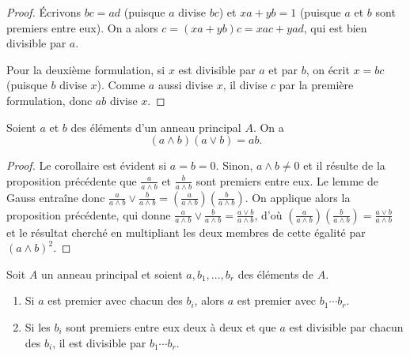 \documentclass[]{report}
\begin{document}
\begin{proof}
    Écrivons $bc = ad$ (puisque $a$ divise $bc$) et $xa + yb = 1$ (puisque $a$ et $b$ sont premiers entre eux). On a alors $c = (xa + yb)c = xac + yad$, qui est bien divisible par $a$.

    Pour la deuxième formulation, si $x$ est divisible par $a$ et par $b$, on écrit $x = bc$ (puisque $b$ divise $x$). Comme $a$ aussi divise $x$, il divise $c$ par la première formulation, donc $ab$ divise $x$.
\end{proof}

\begin{cor}{}{}
    Soient $a$ et $b$ des éléments d'un anneau principal $A$. On a
    \[(a \wedge b)(a \vee b) = ab.\]
\end{cor}

\begin{proof}
    Le corollaire est évident si $a = b = 0$. Sinon, $a \wedge b \neq 0$ et il résulte de la proposition précédente que $\frac{a}{a \wedge b}$ et $\frac{b}{a \wedge b}$ sont premiers entre eux. Le lemme de Gauss entraîne donc $\frac{a}{a \wedge b} \vee \frac{b}{a \wedge b} = \left(\frac{a}{a \wedge b}\right)\left(\frac{b}{a \wedge b}\right)$. On applique alors la proposition précédente, qui donne $\frac{a}{a \wedge b} \vee \frac{b}{a \wedge b} = \frac{a \vee b}{a \wedge b}$, d'où $\left(\frac{a}{a \wedge b}\right)\left(\frac{b}{a \wedge b}\right) = \frac{a \vee b}{a \wedge b}$ et le résultat cherché en multipliant les deux membres de cette égalité par $(a \wedge b)^2$.
\end{proof}

\begin{prop}{}{}
    Soit $A$ un anneau principal et soient $a, b_1, \dots, b_r$ des éléments de $A$.
    \begin{enumerate}
        \item Si $a$ est premier avec chacun des $b_i$, alors $a$ est premier avec $b_1 \cdots b_r$.
        \item Si les $b_i$ sont premiers entre eux deux à deux et que $a$ est divisible par chacun des $b_i$, il est divisible par $b_1 \cdots b_r$.
    \end{enumerate}
\end{prop}
\end{document}
